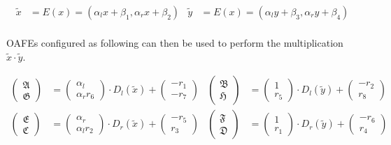 \begin{align*}
  \widetilde{x} & = E(x) = (\alpha_l x + \beta_1, \alpha_r x + \beta_2) &
  \widetilde{y} & = E(x) = (\alpha_l y + \beta_3, \alpha_r y + \beta_4) \\
\end{align*}

\noindent{}OAFEs configured as following can then be used to perform the
multiplication $\widetilde{x} \cdot \widetilde{y}$.

\begin{align*}
\begin{pmatrix}\mathfrak{A}\\\mathfrak{G}\end{pmatrix} & =
\begin{pmatrix}\alpha_l\\\alpha_r r_6\end{pmatrix} \cdot D_l(\widetilde{x}) +
\begin{pmatrix}-r_1\\-r_7\end{pmatrix} &
\begin{pmatrix}\mathfrak{B}\\\mathfrak{H}\end{pmatrix} & =
\begin{pmatrix}1\\r_5\end{pmatrix} \cdot D_l(\widetilde{y}) +
\begin{pmatrix}-r_2\\r_8\end{pmatrix}\\
\begin{pmatrix}\mathfrak{E}\\\mathfrak{C}\end{pmatrix} & =
\begin{pmatrix}\alpha_r\\\alpha_l r_2\end{pmatrix} \cdot D_r(\widetilde{x}) +
\begin{pmatrix}-r_5\\r_3\end{pmatrix} &
\begin{pmatrix}\mathfrak{F}\\\mathfrak{D}\end{pmatrix} & =
\begin{pmatrix}1\\r_1\end{pmatrix} \cdot D_r(\widetilde{y}) +
\begin{pmatrix}-r_6\\r_4\end{pmatrix}\\
\end{align*}

